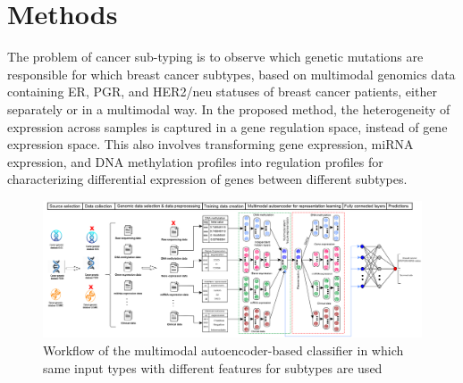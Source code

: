 \section{Methods}\label{chapter_4:mm}
The problem of cancer sub-typing is to observe which genetic mutations are responsible for which breast cancer subtypes, based on multimodal genomics data containing ER, PGR, and HER2/neu statuses of breast cancer patients, either separately or in a multimodal way. 
In the proposed method, the heterogeneity of expression across samples is captured in a gene regulation space, instead of gene expression space. This also involves transforming gene expression, miRNA expression, and DNA methylation profiles into regulation profiles for characterizing differential expression of genes between different subtypes.%

\begin{figure}
	\centering
	\includegraphics[scale=0.75]{images/mae_v2.png}
	\caption[Workflow of the multimodal autoencoder classifier]{Workflow of the multimodal autoencoder-based classifier in which same input types with different features for subtypes %
	are used~\cite{karimACCESS2019}}
	\label{fig:wf_mae}
\end{figure}

